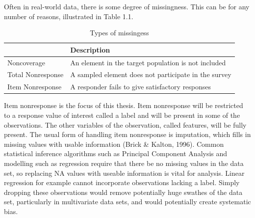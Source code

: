 \documentclass[12pt,twoside]{reedthesis}
\begin{document}
Often in real-world data, there is some degree of missingness. This can
be for any number of reasons, illustrated in Table 1.1.
\begin{table}[t]

\caption{\label{tab:missingness}Types of missingess}
\centering
\begin{tabular}{l|l}
\hline
  & Description\\
\hline
Noncoverage & An element in the target population is not included\\
\hline
Total Nonresponse & A sampled element does not participate in the survey\\
\hline
Item Nonresponse & A responder fails to give satisfactory responses\\
\hline
\end{tabular}
\end{table}
Item nonresponse is the focus of this thesis. Item nonresponse will be
restricted to a response value of interest called a label and will be
present in some of the observations. The other variables of the
observation, called features, will be fully present. The usual form of
handling item nonresponse is imputation, which fills in missing values
with usable information (Brick \& Kalton, 1996). Common statistical
inference algorithms such as Principal Component Analysis and modelling
such as regression require that there be no missing values in the data
set, so replacing NA values with useable information is vital for
analysis. Linear regression for example cannot incorporate observations
lacking a label. Simply dropping these observations would remove
potentially huge swathes of the data set, particularly in multivariate
data sets, and would potentially create systematic bias.
\end{document}
